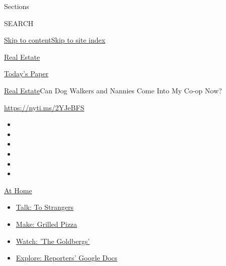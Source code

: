 Sections

SEARCH

\protect\hyperlink{site-content}{Skip to
content}\protect\hyperlink{site-index}{Skip to site index}

\href{https://www.nytimes3xbfgragh.onion/section/realestate}{Real
Estate}

\href{https://myaccount.nytimes3xbfgragh.onion/auth/login?response_type=cookie\&client_id=vi}{}

\href{https://www.nytimes3xbfgragh.onion/section/todayspaper}{Today's
Paper}

\href{/section/realestate}{Real Estate}\textbar{}Can Dog Walkers and
Nannies Come Into My Co-op Now?

\url{https://nyti.ms/2YJeBFS}

\begin{itemize}
\item
\item
\item
\item
\item
\item
\end{itemize}

\href{https://www.nytimes3xbfgragh.onion/spotlight/at-home?action=click\&pgtype=Article\&state=default\&region=TOP_BANNER\&context=at_home_menu}{At
Home}

\begin{itemize}
\tightlist
\item
  \href{https://www.nytimes3xbfgragh.onion/2020/08/03/well/family/the-benefits-of-talking-to-strangers.html?action=click\&pgtype=Article\&state=default\&region=TOP_BANNER\&context=at_home_menu}{Talk:
  To Strangers}
\item
  \href{https://www.nytimes3xbfgragh.onion/2020/08/01/at-home/coronavirus-make-pizza-on-a-grill.html?action=click\&pgtype=Article\&state=default\&region=TOP_BANNER\&context=at_home_menu}{Make:
  Grilled Pizza}
\item
  \href{https://www.nytimes3xbfgragh.onion/2020/07/31/arts/television/goldbergs-abc-stream.html?action=click\&pgtype=Article\&state=default\&region=TOP_BANNER\&context=at_home_menu}{Watch:
  'The Goldbergs'}
\item
  \href{https://www.nytimes3xbfgragh.onion/interactive/2020/at-home/even-more-reporters-editors-diaries-lists-recommendations.html?action=click\&pgtype=Article\&state=default\&region=TOP_BANNER\&context=at_home_menu}{Explore:
  Reporters' Google Docs}
\end{itemize}

